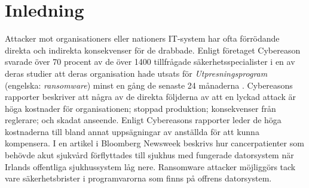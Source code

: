 \section{Inledning}
Attacker mot organisationers eller nationers IT-system har ofta förrödande
direkta och indirekta konsekvenser för de drabbade. Enligt företaget Cybereason
svarade över 70 procent av de över 1400 tillfrågade säkerhetsspecialister i en
av deras studier att deras organisation hade utsats för
\emph{Utpresningsprogram} (engelska: \emph{ransomware}) minst en gång de senaste
24 månaderna \cite{cyberreason2021, cyberreason2022}. Cybereasons rapporter
beskriver att några av de direkta följderna av att en lyckad attack är höga
kostnader för organisationen; stoppad produktion; konsekvenser från reglerare;
och skadat anseende. Enligt Cybereasons rapporter leder de höga kostnaderna till
bland annat uppsägningar av anställda för att kunna kompensera. I en artikel i
Bloomberg Newsweek \cite{gallagher2023} beskrivs hur cancerpatienter som behövde
akut sjukvård förflyttades till sjukhus med fungerade datorsystem när Irlands
offentliga sjukhussystem låg nere. \cite{hse_report} Ransomware attacker
möjliggörs tack vare säkerhetsbrister i programvarorna som finns på offrens
datorsystem.






